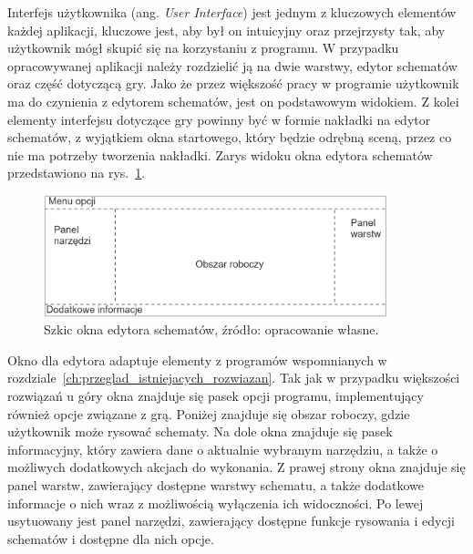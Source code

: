 Interfejs użytkownika (ang. \textit{User Interface}) jest jednym z kluczowych elementów każdej aplikacji,
kluczowe jest, aby był on intuicyjny oraz przejrzysty tak,
aby użytkownik mógł skupić się na korzystaniu z programu.
W przypadku opracowywanej aplikacji należy rozdzielić ją na dwie warstwy,
edytor schematów oraz część dotyczącą gry.
Jako że przez większość pracy w programie użytkownik ma do czynienia z edytorem schematów,
jest on podstawowym widokiem.
Z kolei elementy interfejsu dotyczące gry powinny być w formie nakładki na edytor schematów,
z wyjątkiem okna startowego, który będzie odrębną sceną, przez co nie ma potrzeby tworzenia nakładki.
Zarys widoku okna edytora schematów przedstawiono na rys.~\ref{fig:editor}.

\begin{figure}[h]
    \centering
    \includegraphics[width=0.89\textwidth]{chapters/chapter3/rys/ui_projekt}
    \caption[Szkic okna edytora schematów]{Szkic okna edytora schematów, źródło: opracowanie własne.}
    \label{fig:editor}
\end{figure}

\indent Okno dla edytora adaptuje elementy
z programów wspomnianych w rozdziale~\ref{ch:przeglad_istniejacych_rozwiazan}.
Tak jak w przypadku większości rozwiązań u góry okna znajduje się pasek opcji programu,
implementujący również opcje związane z grą.
Poniżej znajduje się obszar roboczy, gdzie użytkownik może rysować schematy.
Na dole okna znajduje się pasek informacyjny, który zawiera dane o aktualnie wybranym narzędziu,
a także o możliwych dodatkowych akcjach do wykonania.
Z prawej strony okna znajduje się panel warstw, zawierający dostępne warstwy schematu,
a także dodatkowe informacje o nich wraz z możliwością wyłączenia ich widoczności.
Po lewej usytuowany jest panel narzędzi, zawierający dostępne funkcje rysowania i edycji schematów
i dostępne dla nich opcje.
